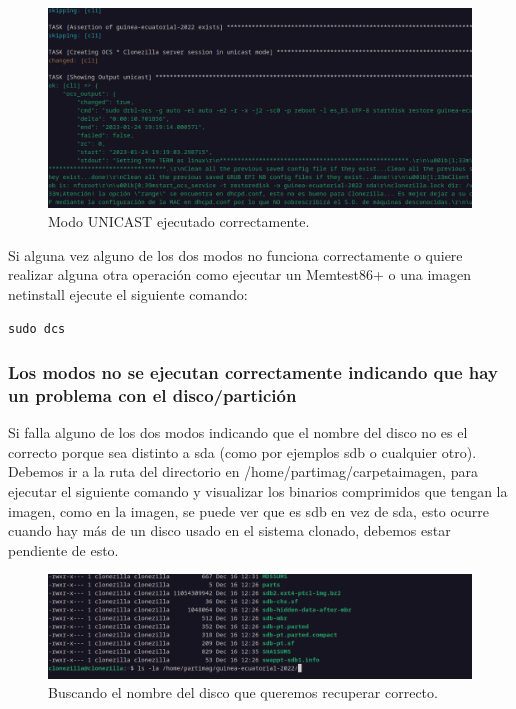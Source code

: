 \begin{figure}[H]
	\centering
	\includegraphics[scale=0.30]{provisioning-ocs/provisioning07}
	\caption{Modo UNICAST ejecutado correctamente.}
\end{figure}

Si alguna vez alguno de los dos modos no funciona correctamente o quiere realizar alguna otra operación como ejecutar un Memtest86+ o una imagen netinstall ejecute el siguiente comando:
\begin{lstlisting}[style=mybash]
sudo dcs	
\end{lstlisting}

\newpage
\subsubsection{Los modos no se ejecutan correctamente indicando que hay un problema con el disco/partición}

Si falla alguno de los dos modos indicando que el nombre del disco no es el correcto porque sea distinto a sda (como por ejemplos sdb o cualquier otro). Debemos 
ir a la ruta del directorio en /home/partimag/carpetaimagen, para ejecutar el siguiente comando y visualizar los binarios comprimidos que tengan la imagen, 
como en la imagen, se puede ver que es sdb en vez de sda, esto ocurre cuando hay más de un disco usado en el sistema clonado, debemos estar pendiente de esto.
\vspace{5mm}

\begin{figure}[H]
	\centering
	\includegraphics[scale=0.30]{provisioning-ocs/provisioning08}
	\caption{Buscando el nombre del disco que queremos recuperar correcto.}
\end{figure}

